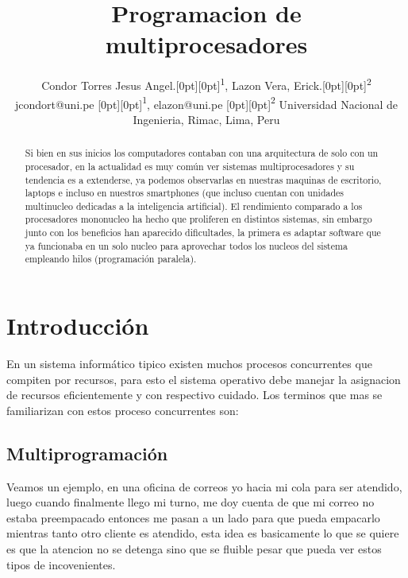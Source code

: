 \documentclass[conference,letterpaper]{IEEEtran}
\DeclareRobustCommand*{\IEEEauthorrefmark}[1]{\raisebox{0pt}[0pt][0pt]{\textsuperscript{\footnotesize #1}}}
\begin{document}
\title
{
Programacion de multiprocesadores
}

\author
{
\IEEEauthorblockN
{
Condor Torres Jesus Angel.\IEEEauthorrefmark{1},
Lazon Vera, Erick.\IEEEauthorrefmark{2} 
}                                     
\IEEEauthorblockA
{
jcondort@uni.pe \IEEEauthorrefmark{1},
elazon@uni.pe \IEEEauthorrefmark{2}
}
\IEEEauthorblockA
{
Universidad Nacional de Ingenieria, Rimac, Lima, Peru}
}

\maketitle

\begin{abstract}
Si bien en sus inicios los computadores contaban con una arquitectura de solo con un procesador, en la actualidad es muy común ver sistemas multiprocesadores y su tendencia es a extenderse, ya podemos observarlas en nuestras maquinas de escritorio, laptops e incluso en nuestros smartphones (que incluso cuentan con unidades multinucleo dedicadas a la inteligencia artificial). El rendimiento comparado a los procesadores mononucleo ha hecho que proliferen en distintos sistemas, sin embargo junto con los beneficios han aparecido dificultades, la primera es adaptar software que ya funcionaba en un solo nucleo para aprovechar todos los nucleos del sistema empleando hilos (programación paralela).
\end{abstract}


\IEEEpeerreviewmaketitle

\vspace{7pt}
\section{Introducción}
En un sistema inform\'atico tipico existen muchos procesos concurrentes que compiten por recursos, para esto el sistema operativo debe manejar la asignacion de recursos eficientemente y con respectivo cuidado. Los terminos que mas se familiarizan con estos proceso concurrentes son:

\subsection{Multiprogramaci\'on}
Veamos un ejemplo, en una oficina de correos yo hacia mi cola para ser atendido, luego cuando finalmente llego mi turno, me doy cuenta de que mi correo no estaba preempacado entonces me pasan a un lado para que pueda empacarlo mientras tanto otro cliente es atendido, esta idea es basicamente lo que se quiere es que la atencion no se detenga sino que se fluible pesar que  pueda ver estos tipos de incovenientes.\\
\end{document}
